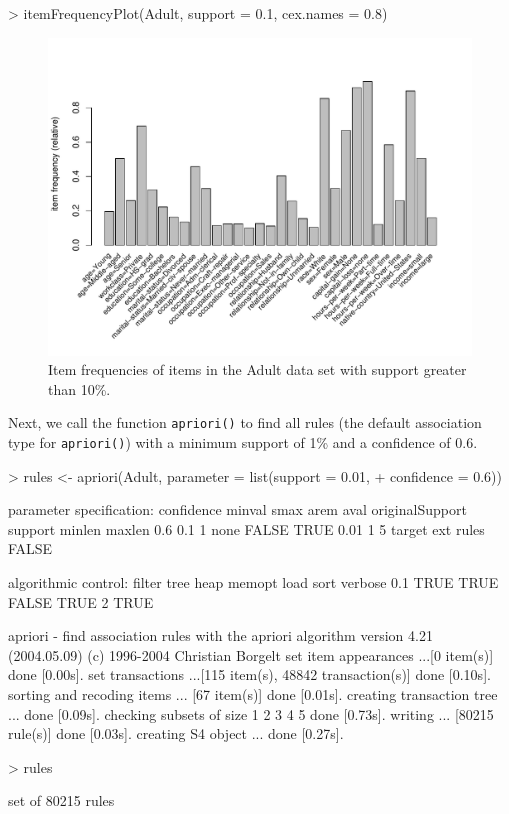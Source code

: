 \documentclass[10pt,a4paper]{article}
\newcommand{\func}[1]{\mbox{\texttt{#1()}}}
\begin{document}
\begin{Schunk}
\begin{Sinput}
> itemFrequencyPlot(Adult, support = 0.1, cex.names = 0.8)
\end{Sinput}
\end{Schunk}
\begin{figure}
\centering
\includegraphics{arules-019}
\caption{Item frequencies of items in the Adult data set with support greater than 10\%.}
\label{fig:itemFrequencyPlot}
\end{figure}

Next, we call the function
\func{apriori} to find all rules (the default association type for
\func{apriori}) with a minimum support of 1\% and a confidence of 0.6.

\begin{Schunk}
\begin{Sinput}
> rules <- apriori(Adult, parameter = list(support = 0.01, 
+     confidence = 0.6))
\end{Sinput}
\begin{Soutput}
parameter specification:
 confidence minval smax arem  aval originalSupport support minlen maxlen
        0.6    0.1    1 none FALSE            TRUE    0.01      1      5
 target   ext
  rules FALSE

algorithmic control:
 filter tree heap memopt load sort verbose
    0.1 TRUE TRUE  FALSE TRUE    2    TRUE

apriori - find association rules with the apriori algorithm
version 4.21 (2004.05.09)        (c) 1996-2004   Christian Borgelt
set item appearances ...[0 item(s)] done [0.00s].
set transactions ...[115 item(s), 48842 transaction(s)] done [0.10s].
sorting and recoding items ... [67 item(s)] done [0.01s].
creating transaction tree ... done [0.09s].
checking subsets of size 1 2 3 4 5 done [0.73s].
writing ... [80215 rule(s)] done [0.03s].
creating S4 object  ... done [0.27s].
\end{Soutput}
\begin{Sinput}
> rules
\end{Sinput}
\begin{Soutput}
set of 80215 rules 
\end{Soutput}
\end{Schunk}
\end{document}
